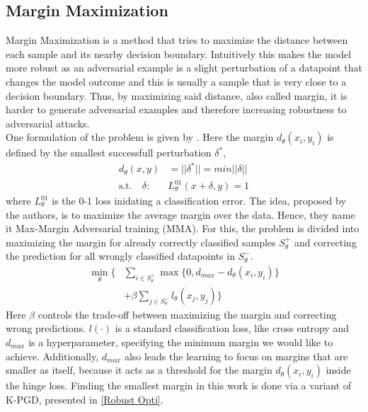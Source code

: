 \documentclass{article}
\begin{document}
\subsection{Margin Maximization}
Margin Maximization is a method that tries to maximize the distance between each sample and its nearby decision boundary. Intuitively this makes the model more robust as an adversarial example is a slight perturbation of a datapoint that changes the model outcome and this is usually a sample that is very close to a decision boundary. Thus, by maximizing said distance, also called margin, it is harder to generate adversarial examples and therefore increasing robustness to adversarial attacks. \\
One formulation of the problem is given by \cite{b1}. Here the margin $d_\theta(x_i, y_i)$ is defined by the smallest successfull perturbation $\delta^*$, 
\begingroup
\setlength\abovedisplayskip{0pt}
\setlength\belowdisplayskip{6pt}
\begin{align*}
  d_\theta(x,y) & = ||\delta^*|| = min ||\delta|| \\ 
  \text{s.t.} \quad \delta: & L_\theta^{01}(x+\delta, y) = 1
\end{align*}
\endgroup
where $L_\theta^{01}$ is the 0-1 loss inidating a classification error. The idea, proposed by the authors, is to maximize the average margin over the data. Hence, they name it Max-Margin Adversarial training (MMA). For this, the problem is divided into maximizing the margin for already correctly classified samples $S_{\theta}^{+}$ and correcting the prediction for all wrongly classified datapoints in $S_{\theta}^{-}$.
\begin{align*}
  \min_{\theta} \Big\{ & \sum_{i \in S_{\theta}^{+}} \max \{0, d_{max} - d_\theta(x_i, y_i)\} \\ 
  & + \beta \sum_{j \in S_{\theta}^{-}} l_\theta (x_j, y_j) \Big\}
\end{align*}
Here $\beta$ controls the trade-off between maximizing the margin and correcting wrong predictions. $l(\cdot)$ is a standard classification loss, like cross entropy and $d_{max}$ is a hyperparameter, specifying the minimum margin we would like to achieve. Additionally, $d_{max}$ also leads the learning to focus on margins that are smaller as itself, because it acts as a threshold for the margin $d_\theta(x_i, y_i)$ inside the hinge loss. Finding the smallest margin in this work is done via a variant of K-PGD, presented in \ref{Robust Opti}.
  
\end{document}
